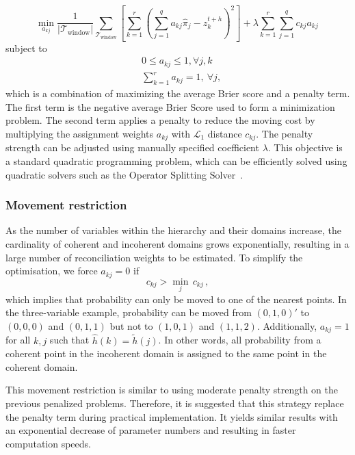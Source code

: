 \documentclass[a4paper,review,12pt,authoryear]{elsarticle}
\begin{document}
    \[
    \underset{a_{kj}}{\min} \frac{1}{|\mathcal{T}_{\textrm{window}}|}\sum\limits_{\mathcal{T}_{\textrm{window}}}\left[\sum\limits_{k=1}^r\left(\sum\limits_{j=1}^q a_{kj}\hat{{\pi}}_j-z^{t+h}_k\right)^2\right] + \lambda\sum\limits_{k=1}^r\sum\limits_{j=1}^q c_{kj}a_{kj}\,
    \]
    subject to
    \begin{align*}
    &0\leq a_{kj}\leq 1,\forall j, k\\
    &\sum\limits_{k=1}^r a_{kj} = 1,~\forall j,
    \end{align*}
    which is a combination of maximizing the average Brier score and a penalty term.
    The first term is the negative average Brier Score used to form a minimization problem. The second term applies a penalty to reduce the moving cost by multiplying the assignment weights $a_{kj}$ with $\mathcal{L}_1$ distance $c_{kj}$. 
    The penalty strength can be adjusted using manually specified coefficient $\lambda$.
    This objective is a standard quadratic programming problem, which can be efficiently solved using quadratic solvers such as the Operator Splitting Solver~\citep[OSQP,][]{stellatoOSQPOperatorSplitting2020}.  

    \subsubsection*{\textbf{Movement restriction}}
    As the number of variables within the hierarchy and their domains increase, the cardinality of coherent and incoherent domains grows exponentially, resulting in a large number of reconciliation weights to be estimated. 
    To simplify the optimisation, we force $a_{kj}=0$ if 
    \[
      c_{kj}>\underset{j}{\min}\,c_{kj}\,,
    \]  
    which implies that probability can only be moved to one of the nearest points. In the three-variable example, probability can be moved from $(0,1,0)'$ to $(0,0,0)$ and $(0,1,1)$ but not to $(1,0,1)$ and $(1,1,2)$. 
    Additionally, $a_{kj}=1$ for all $k,j$ such that $\hat{h}(k)=\tilde{h}(j)$. 
    In other words, all probability from a coherent point in the incoherent domain is assigned to the same point in the coherent domain.

    This movement restriction is similar to using moderate penalty strength on the previous penalized problems.
    Therefore, it is suggested that this strategy replace the penalty term during practical implementation. It yields similar results with an exponential decrease of parameter numbers and resulting in faster computation speeds. 
\end{document}

